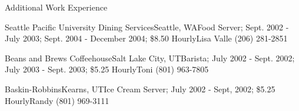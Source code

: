 \documentclass[11pt,oneside]{article}
\begin{document}
\begin{ressection}{Additional Work Experience}
    \begin{expsubsec}{Seattle Pacific University Dining Services}{Seattle, WA}{Food Server; Sept. 2002 - July 2003; Sept. 2004 - December 2004; \$8.50 Hourly}{Lisa Valle (206) 281-2851}
    \end{expsubsec}

    \begin{expsubsec}{Beans and Brews Coffeehouse}{Salt Lake City, UT}{Barista; July 2002 - Sept. 2002; July 2003 - Sept. 2003; \$5.25 Hourly}{Toni (801) 963-7805}
    \end{expsubsec}

    \begin{expsubsec}{Baskin-Robbins}{Kearns, UT}{Ice Cream Server; July 2002 - Sept, 2002; \$5.25 Hourly}{Randy (801) 969-3111}
    \end{expsubsec}


\end{ressection}
\end{document}
